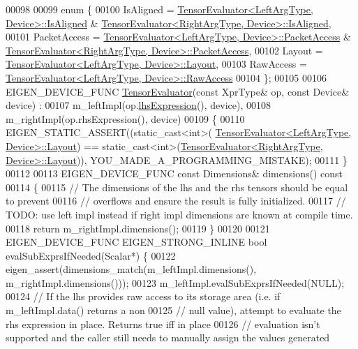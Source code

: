 \begin{DoxyCode}
00098 
00099   \textcolor{keyword}{enum} \{
00100     IsAligned = \hyperlink{struct_eigen_1_1_tensor_evaluator}{TensorEvaluator<LeftArgType, Device>::IsAligned}
       & \hyperlink{struct_eigen_1_1_tensor_evaluator}{TensorEvaluator<RightArgType, Device>::IsAligned},
00101     PacketAccess = \hyperlink{struct_eigen_1_1_tensor_evaluator}{TensorEvaluator<LeftArgType, Device>::PacketAccess}
       & \hyperlink{struct_eigen_1_1_tensor_evaluator}{TensorEvaluator<RightArgType, Device>::PacketAccess},
00102     Layout = \hyperlink{struct_eigen_1_1_tensor_evaluator}{TensorEvaluator<LeftArgType, Device>::Layout},
00103     RawAccess = \hyperlink{struct_eigen_1_1_tensor_evaluator}{TensorEvaluator<LeftArgType, Device>::RawAccess}
00104   \};
00105 
00106   EIGEN\_DEVICE\_FUNC \hyperlink{struct_eigen_1_1_tensor_evaluator}{TensorEvaluator}(\textcolor{keyword}{const} XprType& op, \textcolor{keyword}{const} Device& device) :
00107       m\_leftImpl(op.\hyperlink{class_eigen_1_1_tensor_assign_op_a1a6f7336727e3f95616014883d514caa}{lhsExpression}(), device),
00108       m\_rightImpl(op.rhsExpression(), device)
00109   \{
00110     EIGEN\_STATIC\_ASSERT((static\_cast<int>(
      \hyperlink{struct_eigen_1_1_tensor_evaluator}{TensorEvaluator<LeftArgType, Device>::Layout}) == 
      static\_cast<int>(\hyperlink{struct_eigen_1_1_tensor_evaluator}{TensorEvaluator<RightArgType, Device>::Layout})), 
      YOU\_MADE\_A\_PROGRAMMING\_MISTAKE);
00111   \}
00112 
00113   EIGEN\_DEVICE\_FUNC \textcolor{keyword}{const} Dimensions& dimensions()\textcolor{keyword}{ const}
00114 \textcolor{keyword}{  }\{
00115     \textcolor{comment}{// The dimensions of the lhs and the rhs tensors should be equal to prevent}
00116     \textcolor{comment}{// overflows and ensure the result is fully initialized.}
00117     \textcolor{comment}{// TODO: use left impl instead if right impl dimensions are known at compile time.}
00118     \textcolor{keywordflow}{return} m\_rightImpl.dimensions();
00119   \}
00120 
00121   EIGEN\_DEVICE\_FUNC EIGEN\_STRONG\_INLINE \textcolor{keywordtype}{bool} evalSubExprsIfNeeded(Scalar*) \{
00122     eigen\_assert(dimensions\_match(m\_leftImpl.dimensions(), m\_rightImpl.dimensions()));
00123     m\_leftImpl.evalSubExprsIfNeeded(NULL);
00124     \textcolor{comment}{// If the lhs provides raw access to its storage area (i.e. if m\_leftImpl.data() returns a non}
00125     \textcolor{comment}{// null value), attempt to evaluate the rhs expression in place. Returns true iff in place}
00126     \textcolor{comment}{// evaluation isn't supported and the caller still needs to manually assign the values generated}

\end{DoxyCode}
